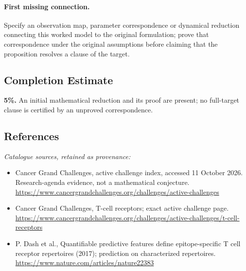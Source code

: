 \documentclass[11pt]{article}
\begin{document}
\paragraph{First missing connection.} Specify an observation map, parameter correspondence or dynamical reduction connecting this worked model to the original formulation; prove that correspondence under the original assumptions before claiming that the proposition resolves a clause of the target.
\subsection{Completion Estimate}
\textbf{5\%.} An initial mathematical reduction and its proof are present; no full-target clause is certified by an unproved correspondence.
\subsection{References}
\noindent\emph{Catalogue sources, retained as provenance:}
\begin{itemize}
\item Cancer Grand Challenges, active challenge index, accessed 11 October 2026. Research-agenda evidence, not a mathematical conjecture. \url{https://www.cancergrandchallenges.org/challenges/active-challenges}
\item Cancer Grand Challenges, T-cell receptors; exact active challenge page. \url{https://www.cancergrandchallenges.org/challenges/active-challenges/t-cell-receptors}
\item P. Dash et al., Quantifiable predictive features define epitope-specific T cell receptor repertoires (2017); prediction on characterized repertoires. \url{https://www.nature.com/articles/nature22383}
\end{itemize}
\end{document}
